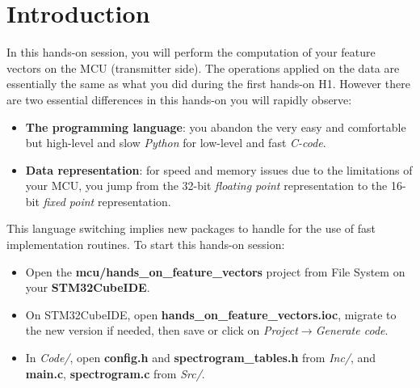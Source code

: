 \section*{Introduction}
%
In this hands-on session, you will perform the computation of your feature vectors on the MCU (transmitter side).
The operations applied on the data are essentially the same as what you did during the first hands-on H1.
However there are two essential differences in this hands-on you will rapidly observe:
\begin{itemize}
    \item \textbf{The programming language}: you abandon the very easy and comfortable but high-level and slow \emph{Python} for low-level and fast \emph{C-code}.
    \item \textbf{Data representation}: for speed and memory issues due to the limitations of your MCU, you jump from the 32-bit \emph{floating point} representation to the 16-bit \emph{fixed point} representation.
\end{itemize}
%
This language switching implies new packages to handle for the use of fast implementation routines.
To start this hands-on session:
\begin{itemize}
    \item Open the \textbf{mcu/hands\_on\_feature\_vectors} project from File System on your \textbf{STM32CubeIDE}.
    \item On STM32CubeIDE, open \textbf{hands\_on\_feature\_vectors.ioc}, migrate to the new version if needed, then save or click on \emph{Project$\rightarrow$Generate code}.
    \item In \emph{Code/}, open \textbf{config.h} and \textbf{spectrogram\_tables.h} from \emph{Inc/}, and \textbf{main.c}, \textbf{spectrogram.c} from \emph{Src/}.
\end{itemize}

